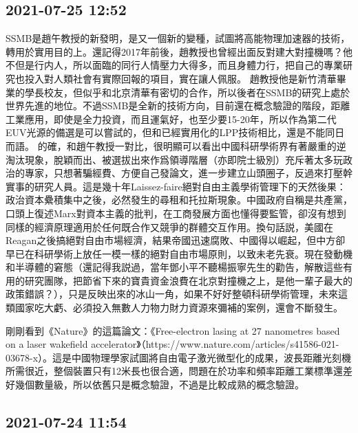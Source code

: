 \documentclass[twocolumn]{ctexart}
\begin{document}
\subsection*{2021-07-25 12:52}

SSMB是趙午教授的新發明，是又一個新的變種，試圖將高能物理加速器的技術，轉用於實用目的上。還記得2017年前後，趙教授也曾經出面反對建大對撞機嗎？他不但是行内人，所以面臨的同行人情壓力大得多，而且身體力行，把自己的專業研究也投入對人類社會有實際回報的項目，實在讓人佩服。
趙教授他是新竹清華畢業的學長校友，但似乎和北京清華有密切的合作，所以後者在SSMB的研究上處於世界先進的地位。不過SSMB是全新的技術方向，目前還在概念驗證的階段，距離工業應用，即使是全力投資，而且運氣好，也至少要15-20年，所以作為第二代EUV光源的備選是可以嘗試的，但和已經實用化的LPP技術相比，還是不能同日而語。
的確，和趙午教授一對比，很明顯可以看出中國科研學術界有著嚴重的逆淘汰現象，脫穎而出、被選拔出來作爲領導階層（亦即院士級別）充斥著太多玩政治的專家，只想著騙經費、方便自己發論文，進一步建立山頭圈子，反過來打壓幹實事的研究人員。這是幾十年Laissez-faire絕對自由主義學術管理下的天然後果：政治資本纍積集中之後，必然發生的尋租和托拉斯現象。中國政府自稱是共產黨，口頭上復述Marx對資本主義的批判，在工商發展方面也懂得要監管，卻沒有想到同樣的經濟原理適用於任何既合作又競爭的群體交互作用。換句話説，美國在Reagan之後搞絕對自由市場經濟，結果帝國迅速腐敗、中國得以崛起，但中方卻早已在科研學術上放任一模一樣的絕對自由市場原則，以致未老先衰。現在發動機和半導體的窘態（還記得我説過，當年鄧小平不聽楊振寧先生的勸告，解散這些有用的研究團隊，把節省下來的寶貴資金浪費在北京對撞機之上，是他一輩子最大的政策錯誤？），只是反映出來的冰山一角，如果不好好整頓科研學術管理，未來這類國家吃大虧、必須投入無數人力物力財力資源來彌補的案例，還會不斷發生。

剛剛看到《Nature》的這篇論文：《Free-electron lasing at 27 nanometres based on a laser wakefield accelerator》（https://www.nature.com/articles/s41586-021-03678-x）。這是中國物理學家試圖將自由電子激光微型化的成果，波長距離光刻機所需很近，整個裝置只有12米長也很合適，問題在於功率和頻率距離工業標準還差好幾個數量級，所以依舊只是概念驗證，不過是比較成熟的概念驗證。
\subsection*{2021-07-24 11:54}
\end{document}

